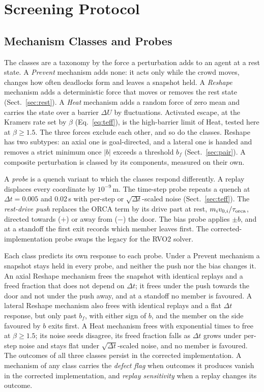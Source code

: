 \section{Screening Protocol}\label{sec:signatures}
\subsection{Mechanism Classes and Probes}
The classes are a taxonomy by the force a perturbation adds to an agent at a rest state. A \emph{Prevent} mechanism adds none: it acts only while the crowd moves, changes how often deadlocks form and leaves a snapshot held. A \emph{Reshape} mechanism adds a deterministic force that moves or removes the rest state (Sect.~\ref{sec:rest}). A \emph{Heat} mechanism adds a random force of zero mean and carries the state over a barrier $\Delta U$ by fluctuations. Activated escape, at the Kramers rate set by $\beta$ (Eq.~\eqref{eq:teff}), is the high-barrier limit of Heat, tested here at $\beta\ge1.5$. The three forces exclude each other, and so do the classes. Reshape has two subtypes: an axial one is goal-directed, and a lateral one is handed and removes a strict minimum once $|b|$ exceeds a threshold $b_f$ (Sect.~\ref{sec:pair}). A composite perturbation is classed by its components, measured on their own.

A \emph{probe} is a quench variant to which the classes respond differently. A replay displaces every coordinate by $10^{-9}$\,m. The time-step probe repeats a quench at $\Delta t=0.005$ and 0.02\,s with per-step or $\sqrt{\Delta t}$-scaled noise (Sect.~\ref{sec:teff}). The \emph{rest-drive push} replaces the ORCA term by its drive part at rest, $m_iv_{0,i}/\tau_{\rm orca}$, directed towards ($+$) or away from ($-$) the door. The bias probe applies $\pm b$, and at a standoff the first exit records which member leaves first. The corrected-implementation probe swaps the legacy for the RVO2 solver.

Each class predicts its own response to each probe. Under a Prevent mechanism a snapshot stays held in every probe, and neither the push nor the bias changes it. An axial Reshape mechanism frees the snapshot with identical replays and a freed fraction that does not depend on $\Delta t$; it frees under the push towards the door and not under the push away, and at a standoff no member is favoured. A lateral Reshape mechanism also frees with identical replays and a flat $\Delta t$ response, but only past $b_f$, with either sign of $b$, and the member on the side favoured by $b$ exits first. A Heat mechanism frees with exponential times to free at $\beta\ge1.5$; its noise seeds disagree, its freed fraction falls as $\Delta t$ grows under per-step noise and stays flat under $\sqrt{\Delta t}$-scaled noise, and no member is favoured. The outcomes of all three classes persist in the corrected implementation. A mechanism of any class carries the \emph{defect flag} when outcomes it produces vanish in the corrected implementation, and \emph{replay sensitivity} when a replay changes its outcome.

